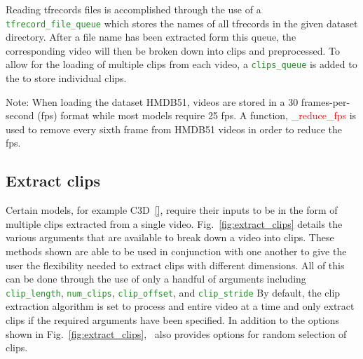 \documentclass{llncs}
\begin{document}
Reading tfrecords files is accomplished through the use of a \texttt{\textcolor{ForestGreen}{tfrecord\_file\_queue}} which stores the names of all tfrecords in the given dataset directory.
After a file name has been extracted form this queue, the corresponding video will then be broken down into clips and preprocessed.
To allow for the loading of multiple clips from each video, a \texttt{\textcolor{ForestGreen}{clips\_queue}} is added to the \data to store individual clips.

Note: When loading the dataset HMDB51, videos are stored in a 30 frames-per-second (fps) format while most models require 25 fps. A function, \textcolor{red}{\_reduce\_fps} is used to remove every sixth frame from HMDB51 videos in order to reduce the fps.


\subsection{Extract clips}
\label{sec:extractclips}
Certain models, for example C3D~\ref{}, require their inputs to be in the form of multiple clips extracted from a single video.
Fig.~\ref{fig:extract_clips} details the various arguments that are available to break down a video into clips.
These methods shown are able to be used in conjunction with one another to give the user the flexibility needed to extract clips with different dimensions.
All of this can be done through the use of only a handful of arguments including \texttt{\textcolor{ForestGreen}{clip\_length}}, \texttt{\textcolor{ForestGreen}{num\_clips}}, \texttt{\textcolor{ForestGreen}{clip\_offset}}, and \texttt{\textcolor{ForestGreen}{clip\_stride}}
By default, the clip extraction algorithm is set to process and entire video at a time and only extract clips if the required arguments have been specified.
In addition to the options shown in Fig.~\ref{fig:extract_clips}, \acro~also provides options for random selection of clips.
\end{document}
